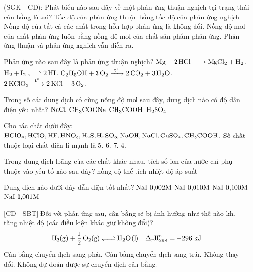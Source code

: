\documentclass[12pt,a4paper]{article}
\begin{document}
\begin{ex}
(SGK - CD): Phát biểu nào sau đây về một phản ứng thuận nghịch tại trạng thái cân bằng là sai?
\choice
{Tốc độ của phản ứng thuận bằng tốc độ của phản ứng nghịch.}
{Nồng độ của tất cả các chất trong hỗn hợp phản ứng là không đổi.}
{Nồng độ mol của chất phản ứng luôn bằng nồng độ mol của chất sản phẩm phản ứng.}
{Phản ứng thuận và phản ứng nghịch vẫn diễn ra.}
\loigiai{}
\end{ex}

\begin{ex}
Phản ứng nào sau đây là phản ứng thuận nghịch?
\choice
{$\ce{Mg + 2HCl -> MgCl2 + H2}$.}
{$\ce{H2 + I2 <=> 2HI}$.}
{$\ce{C2H5OH + 3O2 ->[t^\circ] 2CO2 + 3H2O}$.}
{$\ce{2KClO3 ->[t^\circ] 2KCl + 3O2}$.}
\loigiai{}
\end{ex}

\begin{ex}
Trong số các dung dịch có cùng nồng độ mol sau đây, dung dịch nào có độ dẫn điện yếu nhất?
\choice
{$\ce{NaCl}$}
{$\ce{CH3COONa}$}
{$\ce{CH3COOH}$}
{$\ce{H2SO4}$}
\loigiai{}
\end{ex}

\begin{ex}
Cho các chất dưới đây: $\ce{HClO4}, \ce{HClO}, \ce{HF}, \ce{HNO3}, \ce{H2S}, \ce{H2SO3}, \ce{NaOH}, \ce{NaCl}, \ce{CuSO4}, \ce{CH3COOH}$. Số chất thuộc loại chất điện li mạnh là
\choice
{5.}
{6.}
{7.}
{4.}
\loigiai{}
\end{ex}

\begin{ex}
Trong dung dịch loãng của các chất khác nhau, tích số ion của nước chỉ phụ thuộc vào yếu tố nào sau đây?
\choice
{nồng độ}
{thể tích}
{nhiệt độ}
{áp suất}
\loigiai{}
\end{ex}

\begin{ex}
Dung dịch nào dưới đây dẫn điện tốt nhất?
\choice
{$\ce{NaI}\ 0{,}002\text{M}$}
{$\ce{NaI}\ 0{,}010\text{M}$}
{$\ce{NaI}\ 0{,}100\text{M}$}
{$\ce{NaI}\ 0{,}001\text{M}$}
\loigiai{}
\end{ex}

\begin{ex}
{[CD - SBT]} Đối với phản ứng sau, cân bằng sẽ bị ảnh hưởng như thế nào khi tăng nhiệt độ (các điều kiện khác giữ không đổi)?
\[ \ce{H2(g) + 1/2 O2(g) <=> H2O(l)} \quad \Delta_r\text{H}^\circ_{298} = -296\text{ kJ} \]
\choice
{Cân bằng chuyển dịch sang phải.}
{Cân bằng chuyển dịch sang trái.}
{Không thay đổi.}
{Không dự đoán được sự chuyển dịch cân bằng.}
\loigiai{}
\end{ex}
\end{document}
